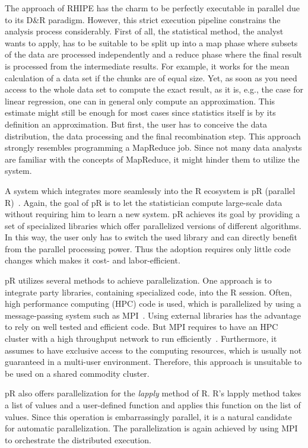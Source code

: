 The approach of RHIPE has the charm to be perfectly executable in parallel due to its D\&R paradigm.
However, this strict execution pipeline constrains the analysis process considerably.
First of all, the statistical method, the analyst wants to apply, has to be suitable to be split up into a map phase where subsets of the data are processed independently and a reduce phase where the final result is processed from the intermediate results.
For example, it works for the mean calculation of a data set if the chunks are of equal size.
Yet, as soon as you need access to the whole data set to compute the exact result, as it is, e.g., the case for linear regression, one can in general only compute an approximation.
This estimate might still be enough for most cases since statistics itself is by its definition an approximation.
But first, the user has to conceive the data distribution, the data processing and the final recombination step.
This approach strongly resembles programming a MapReduce job.
Since not many data analysts are familiar with the concepts of MapReduce, it might hinder them to utilize the system.

A system which integrates more seamlessly into the R ecosystem is pR (parallel R)~\cite{samatova:2009a}.
Again, the goal of pR is to let the statistician compute large-scale data without requiring him to learn a new system.
pR achieves its goal by providing a set of specialized libraries which offer parallelized versions of different algorithms.
In this way, the user only has to switch the used library and can directly benefit from the parallel processing power.
Thus the adoption requires only little code changes which makes it cost- and labor-efficient.

pR utilizes several methods to achieve parallelization.
One approach is to integrate  party libraries, containing specialized code, into the R session.
Often, high performance computing (HPC) code is used, which is parallelized by using a message-passing system such as MPI~\cite{gropp:pc1996a,lusk:2009a}.
Using external libraries has the advantage to rely on well tested and efficient code.
But MPI requires to have an HPC cluster with a high throughput network to run efficiently~\cite{sur:2006a}.
Furthermore, it assumes to have exclusive access to the computing resources, which is usually not guaranteed in a multi-user environment.
Therefore, this approach is unsuitable to be used on a shared commodity cluster.

pR also offers parallelization for the \emph{lapply} method of R.
R's lapply method takes a list of values and a user-defined function and applies this function on the list of values.
Since this operation is embarrassingly parallel, it is a natural candidate for automatic parallelization.
The parallelization is again achieved by using MPI to orchestrate the distributed execution.

